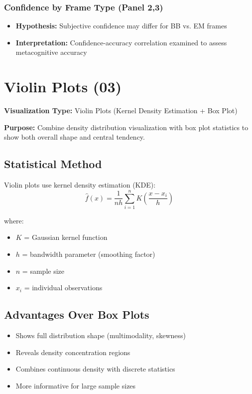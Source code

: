 \documentclass[12pt,a4paper]{article}
\begin{document}
\subsubsection{Confidence by Frame Type (Panel 2,3)}
\begin{itemize}
    \item \textbf{Hypothesis:} Subjective confidence may differ for BB vs. EM frames
    \item \textbf{Interpretation:} Confidence-accuracy correlation examined to assess metacognitive accuracy
\end{itemize}

\newpage
\section{Violin Plots (03)}

\textbf{Visualization Type:} Violin Plots (Kernel Density Estimation + Box Plot)

\textbf{Purpose:} Combine density distribution visualization with box plot statistics to show both overall shape and central tendency.

\subsection{Statistical Method}

Violin plots use kernel density estimation (KDE):
\begin{equation}
\hat{f}(x) = \frac{1}{nh} \sum_{i=1}^{n} K\left(\frac{x - x_i}{h}\right)
\end{equation}

where:
\begin{itemize}
    \item $K$ = Gaussian kernel function
    \item $h$ = bandwidth parameter (smoothing factor)
    \item $n$ = sample size
    \item $x_i$ = individual observations
\end{itemize}

\subsection{Advantages Over Box Plots}
\begin{itemize}
    \item Shows full distribution shape (multimodality, skewness)
    \item Reveals density concentration regions
    \item Combines continuous density with discrete statistics
    \item More informative for large sample sizes
\end{itemize}
\end{document}
